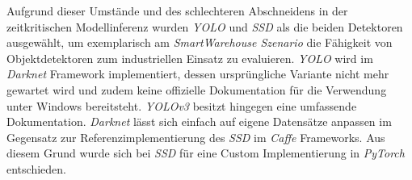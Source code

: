 Aufgrund dieser Umstände und des schlechteren Abschneidens in der zeitkritischen Modellinferenz wurden \textit{YOLO} und \textit{SSD} als die beiden Detektoren ausgewählt, um exemplarisch am \textit{SmartWarehouse Szenario} die Fähigkeit von Objektdetektoren zum industriellen Einsatz zu evaluieren. \textit{YOLO} wird im \textit{Darknet} Framework implementiert, dessen ursprüngliche Variante nicht mehr gewartet wird und zudem keine offizielle Dokumentation für die Verwendung unter Windows bereitsteht. \textit{YOLOv3} besitzt hingegen eine umfassende Dokumentation. \textit{Darknet} lässt sich einfach auf eigene Datensätze anpassen im Gegensatz zur Referenzimplementierung des \textit{SSD} im \textit{Caffe} Frameworks. Aus diesem Grund wurde sich bei \textit{SSD} für eine Custom Implementierung in \textit{PyTorch} entschieden.